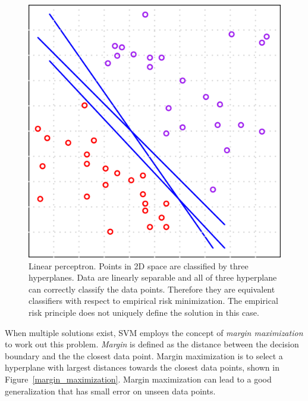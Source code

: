 \documentclass[english]{tktltiki}
\begin{document}
\begin{figure}[t]
\begin{center}
\centering
\includegraphics[width=0.60\columnwidth]{./plots/linear_perceptron.pdf}
\caption[Linear perceptron description.]{Linear perceptron. Points in 2D space are classified by three hyperplanes. Data are linearly separable and all of three hyperplane can correctly classify the data points. Therefore they are equivalent classifiers with respect to empirical risk minimization. The empirical risk principle does not uniquely define the solution in this case.}
\label{linear_perceptron}
\end{center}
\end{figure}


When multiple solutions exist, SVM employs the concept of {\em margin maximization} to work out this problem. {\em Margin} is defined as the distance between the decision boundary and the the closest data point. {Margin maximization} is to select a hyperplane with largest distances towards the closest data points, shown in Figure~\ref{margin_maximization}. Margin maximization can lead to a good generalization that has small error on unseen data points.
\end{document}
